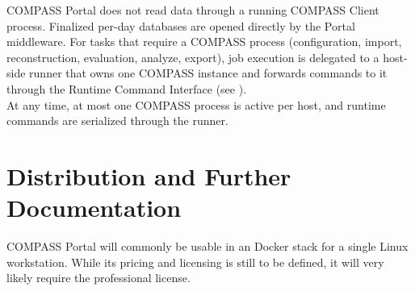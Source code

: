 COMPASS Portal does not read data through a running COMPASS Client process. Finalized per-day databases are opened directly by the Portal middleware. For tasks that require a COMPASS process (configuration, import, reconstruction, evaluation, analyze, export), job execution is delegated to a host-side runner that owns one COMPASS instance and forwards commands to it through the Runtime Command Interface (see ). \\

At any time, at most one COMPASS process is active per host, and runtime commands are serialized through the runner.

\section{Distribution and Further Documentation}

COMPASS Portal will commonly be usable in an Docker stack for a single Linux workstation. While its pricing and licensing is still to be defined, it will very likely require the professional license. \\


